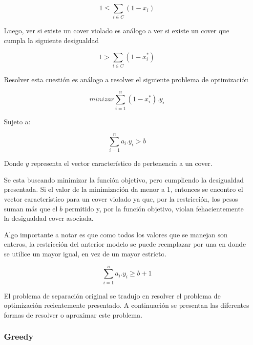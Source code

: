 \begin{equation}
1 \leq \sum\limits_{i \in C}(1 - x_i)
\end{equation}


Luego, ver si existe un cover violado es an\'alogo a ver si existe un cover que cumpla la siguiente desigualdad

\begin{equation}
1 > \sum\limits_{i \in C} (1 - x_i^*)
\end{equation}

Resolver esta cuesti\'on es an\'alogo a resolver el siguiente problema de optimizaci\'on

\begin{equation}
minizar \sum\limits_{i=1}^n(1-x_i^*).y_i
\end{equation}

Sujeto a:

\begin{equation}
\sum\limits_{i=1}^n a_i . y_i > b
\end{equation}


Donde $y$ representa el vector caracter\'istico de pertenencia a un cover.

Se esta buscando minimizar la funci\'on objetivo, pero cumpliendo la desigualdad presentada. Si el valor de la minimizaci\'on da menor a 1, entonces se encontro el vector caracter\'istico para un cover violado ya que, por la restricci\'on, los pesos suman m\'as que el $b$ permitido y, por la funci\'on objetivo, violan fehacientemente la desigualdad cover asociada.


\medskip

Algo importante a notar es que como todos los valores que se manejan son enteros, la restricci\'on del anterior modelo se puede reemplazar por una en donde se utilice un mayor igual, en vez de un mayor estricto.

\begin{equation}
\sum\limits_{i=1}^n a_i . y_i \geq b + 1
\end{equation}




El problema de separaci\'on original se tradujo en resolver el problema de optimizaci\'on recientemente presentado. A continuaci\'on se presentan las diferentes formas de resolver o aproximar este problema.

\bigskip
\subsubsection{Greedy}

